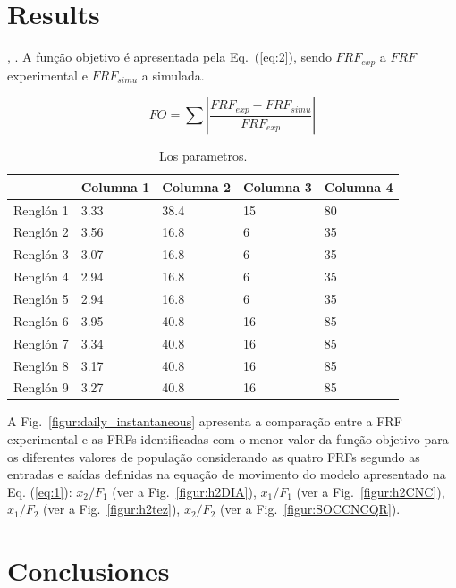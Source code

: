 \documentclass[journal, twoside]{IEEEtran}
\begin{document}
      

\section{Results}

\lipsum[5-10]  \cite{koroishi2016robust}, \cite{ahlawat2001multiobjective}.
 A função objetivo é apresentada pela Eq.~(\ref{eq:2}), sendo $FRF_{exp}$ a $FRF$ experimental e $FRF_{simu}$ a simulada.

\begin{equation}
	FO=\sum \left| \frac{FRF_{exp}- FRF_{simu}}{FRF_{exp}} \right|
	\label{eq:2}
\end{equation}

\begin{table}[!t]
	\caption{Los parametros.}
	\label{tab:FO}
	\centering
		\begin{tabular}{lllll} %
		\hline
	\hline
	&	Columna 1	&	Columna 2	&	Columna 3	&	Columna 4	\\
	\hline
Renglón 1	&	3.33	&	38.4	&	15	&	80	\\
Renglón 2	&	3.56	&	16.8	&	6	&	35	\\
Renglón 3	&	3.07	&	16.8	&	6	&	35	\\
Renglón 4	&	2.94	&	16.8	&	6	&	35	\\
Renglón 5	&	2.94	&	16.8	&	6	&	35	\\
Renglón 6	&	3.95	&	40.8	&	16	&	85	\\
Renglón 7	&	3.34	&	40.8	&	16	&	85	\\
Renglón 8	&	3.17	&	40.8	&	16	&	85	\\
Renglón 9	&	3.27	&	40.8	&	16	&	85	\\
		\hline
	\hline
	\end{tabular}%
\end{table}

A Fig.~\ref{figur:daily_instantaneous} apresenta a comparação entre a FRF experimental e as FRFs identificadas com o menor valor da função objetivo para os diferentes valores de população considerando as quatro FRFs segundo as entradas e saídas definidas na equação de movimento do modelo apresentado na Eq. (\ref{eq:1}): $x_2/F_1$ (ver a Fig.~\ref{figur:h2DIA}), $x_1/F_1$ (ver a Fig.~\ref{figur:h2CNC}), $x_1/F_2$ (ver a Fig.~\ref{figur:h2tez}), $x_2/F_2$ (ver a Fig.~\ref{figur:SOCCNCQR}). \cite{ahlawat2001multiobjective}

\lipsum[11-15]

\section{Conclusiones}
\end{document}

